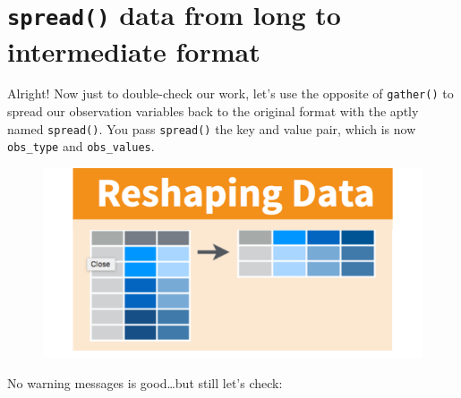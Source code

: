 \documentclass[]{book}
\newenvironment{Shaded}{\begin{snugshade}}{\end{snugshade}}
\newcommand{\KeywordTok}[1]{\textcolor[rgb]{0.13,0.29,0.53}{\textbf{{#1}}}}
\newcommand{\DataTypeTok}[1]{\textcolor[rgb]{0.13,0.29,0.53}{{#1}}}
\newcommand{\StringTok}[1]{\textcolor[rgb]{0.31,0.60,0.02}{{#1}}}
\newcommand{\CommentTok}[1]{\textcolor[rgb]{0.56,0.35,0.01}{\textit{{#1}}}}
\newcommand{\NormalTok}[1]{{#1}}
\theoremstyle{definition}
\theoremstyle{definition}
\theoremstyle{definition}
\theoremstyle{remark}
\begin{document}
\begin{Shaded}
\end{Shaded}

\section{\texorpdfstring{\texttt{spread()} data from long to
intermediate
format}{spread() data from long to intermediate format}}\label{spread-data-from-long-to-intermediate-format}

Alright! Now just to double-check our work, let's use the opposite of
\texttt{gather()} to spread our observation variables back to the
original format with the aptly named \texttt{spread()}. You pass
\texttt{spread()} the key and value pair, which is now
\texttt{obs\_type} and \texttt{obs\_values}.

\begin{figure}[htbp]
\centering
\includegraphics{img/rstudio-cheatsheet-reshaping-data-spread.png}
\caption{}
\end{figure}

\begin{Shaded}
\end{Shaded}

No warning messages is good\ldots{}but still let's check:
\end{document}
